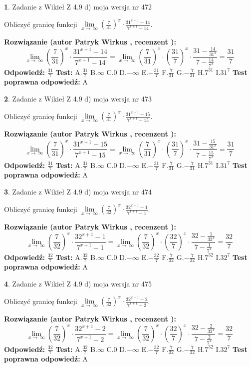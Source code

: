\documentclass[12pt, a4paper]{article}
\theoremstyle{definition} %
\newtheorem{zad}{}
\newcommand{\zadStart}[1]{\begin{zad}#1\newline}
\newcommand{\zadStop}{\end{zad}}
\newcommand{\rozwStart}[2]{\noindent \textbf{Rozwiązanie (autor #1 , recenzent #2): }\newline}
\newcommand{\rozwStop}{\newline}
\newcommand{\odpStart}{\noindent \textbf{Odpowiedź:}\newline}
\newcommand{\odpStop}{\newline}
\newcommand{\testStart}{\noindent \textbf{Test:}\newline}
\newcommand{\testStop}{\newline}
\newcommand{\kluczStart}{\noindent \textbf{Test poprawna odpowiedź:}\newline}
\newcommand{\kluczStop}{\newline}
\begin{document}
\zadStart{Zadanie z Wikieł Z 4.9 d) moja wersja nr 472}


Obliczyć granicę funkcji  $\lim\limits_{x\to\ \infty}(\frac{7}{31})^{x}\cdot\frac{31^{x+1}-14}{7^{x+1}-14}$.
\zadStop
\rozwStart{Patryk Wirkus}{}
$$\lim\limits_{x\to\ \infty}(\frac{7}{31})^{x}\cdot\frac{31^{x+1}-14}{7^{x+1}-14}=\lim\limits_{x\to\ \infty}(\frac{7}{31})^{x}\cdot(\frac{31}{7})^{x} \cdot \frac{31-\frac{14}{31^{x}}}{7-\frac{14}{7^{x}}} = \frac{31}{7}$$
\rozwStop
\odpStart
$\frac{31}{7}$
\odpStop
\testStart
A.$\frac{31}{7}$ B.$\infty$ C.$0$ D.$-\infty$ E.$-\frac{31}{7}$
F.$\frac{7}{31}$ G.$-\frac{7}{31}$
H.$7^{31}$
I.$31^{7}$
\testStop
\kluczStart
A
\kluczStop



\zadStart{Zadanie z Wikieł Z 4.9 d) moja wersja nr 473}


Obliczyć granicę funkcji  $\lim\limits_{x\to\ \infty}(\frac{7}{31})^{x}\cdot\frac{31^{x+1}-15}{7^{x+1}-15}$.
\zadStop
\rozwStart{Patryk Wirkus}{}
$$\lim\limits_{x\to\ \infty}(\frac{7}{31})^{x}\cdot\frac{31^{x+1}-15}{7^{x+1}-15}=\lim\limits_{x\to\ \infty}(\frac{7}{31})^{x}\cdot(\frac{31}{7})^{x} \cdot \frac{31-\frac{15}{31^{x}}}{7-\frac{15}{7^{x}}} = \frac{31}{7}$$
\rozwStop
\odpStart
$\frac{31}{7}$
\odpStop
\testStart
A.$\frac{31}{7}$ B.$\infty$ C.$0$ D.$-\infty$ E.$-\frac{31}{7}$
F.$\frac{7}{31}$ G.$-\frac{7}{31}$
H.$7^{31}$
I.$31^{7}$
\testStop
\kluczStart
A
\kluczStop



\zadStart{Zadanie z Wikieł Z 4.9 d) moja wersja nr 474}


Obliczyć granicę funkcji  $\lim\limits_{x\to\ \infty}(\frac{7}{32})^{x}\cdot\frac{32^{x+1}-1}{7^{x+1}-1}$.
\zadStop
\rozwStart{Patryk Wirkus}{}
$$\lim\limits_{x\to\ \infty}(\frac{7}{32})^{x}\cdot\frac{32^{x+1}-1}{7^{x+1}-1}=\lim\limits_{x\to\ \infty}(\frac{7}{32})^{x}\cdot(\frac{32}{7})^{x} \cdot \frac{32-\frac{1}{32^{x}}}{7-\frac{1}{7^{x}}} = \frac{32}{7}$$
\rozwStop
\odpStart
$\frac{32}{7}$
\odpStop
\testStart
A.$\frac{32}{7}$ B.$\infty$ C.$0$ D.$-\infty$ E.$-\frac{32}{7}$
F.$\frac{7}{32}$ G.$-\frac{7}{32}$
H.$7^{32}$
I.$32^{7}$
\testStop
\kluczStart
A
\kluczStop



\zadStart{Zadanie z Wikieł Z 4.9 d) moja wersja nr 475}


Obliczyć granicę funkcji  $\lim\limits_{x\to\ \infty}(\frac{7}{32})^{x}\cdot\frac{32^{x+1}-2}{7^{x+1}-2}$.
\zadStop
\rozwStart{Patryk Wirkus}{}
$$\lim\limits_{x\to\ \infty}(\frac{7}{32})^{x}\cdot\frac{32^{x+1}-2}{7^{x+1}-2}=\lim\limits_{x\to\ \infty}(\frac{7}{32})^{x}\cdot(\frac{32}{7})^{x} \cdot \frac{32-\frac{2}{32^{x}}}{7-\frac{2}{7^{x}}} = \frac{32}{7}$$
\rozwStop
\odpStart
$\frac{32}{7}$
\odpStop
\testStart
A.$\frac{32}{7}$ B.$\infty$ C.$0$ D.$-\infty$ E.$-\frac{32}{7}$
F.$\frac{7}{32}$ G.$-\frac{7}{32}$
H.$7^{32}$
I.$32^{7}$
\testStop
\kluczStart
A
\kluczStop
\end{document}

